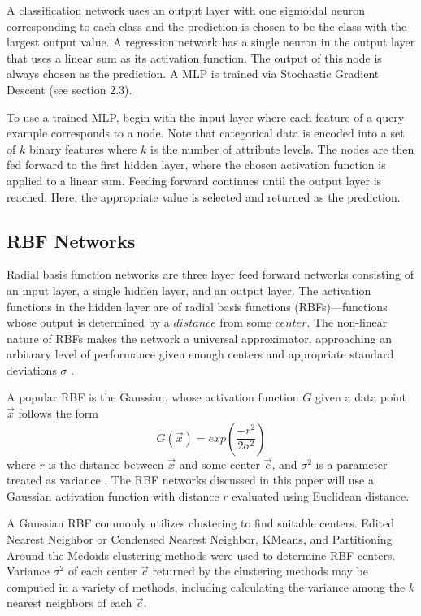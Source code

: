 \documentclass[twoside,10pt]{article}
\begin{document}
A classification network uses an output layer with one sigmoidal neuron corresponding to each class and the prediction is chosen to be the class with the largest output value. A regression network has a single neuron in the output layer that uses a linear sum as its activation function. The output of this node is always chosen as the prediction.
A MLP is trained via Stochastic Gradient Descent (see section 2.3).

To use a trained MLP, begin with the input layer where each feature of a query example corresponds to a node. Note that categorical data is encoded into a set of $k$ binary features where $k$ is the number of attribute levels.
The nodes are then fed forward to the first hidden layer, where the chosen activation function is applied to a linear sum. Feeding forward continues until the output layer is reached. Here, the appropriate value is selected and returned as the prediction.

\subsection{RBF Networks}
	Radial basis function networks are three layer feed forward networks consisting of an input layer, a single hidden layer, and an output layer. The activation functions in the hidden layer are of radial basis functions (RBFs)---functions whose output is determined by a $distance$ from some $center$. The non-linear nature of RBFs makes the network a universal approximator, approaching an arbitrary level of performance given enough centers and appropriate standard deviations $\sigma$ \citep{rbf}.

	A popular RBF is the Gaussian, whose activation function $G$ given a data point $\vec{x}$ follows the form
	$$G(\vec{x}) = exp({\frac{-r^2}{2\sigma^2}})$$
	where $r$ is the distance between $\vec x$ and some center $\vec c$, and $\sigma^2$ is a parameter treated as variance \citep{rbfintro}. The RBF networks discussed in this paper will use a Gaussian activation function with distance $r$ evaluated using Euclidean distance.

	A Gaussian RBF commonly utilizes clustering to find suitable centers. Edited Nearest Neighbor or Condensed Nearest Neighbor, KMeans, and Partitioning Around the Medoids clustering methods were used to determine RBF centers. Variance $\sigma^2$ of each center $\vec c$ returned by the clustering methods may be computed in a variety of methods, including calculating the variance among the $k$ nearest neighbors of each $\vec c$.
\end{document}
